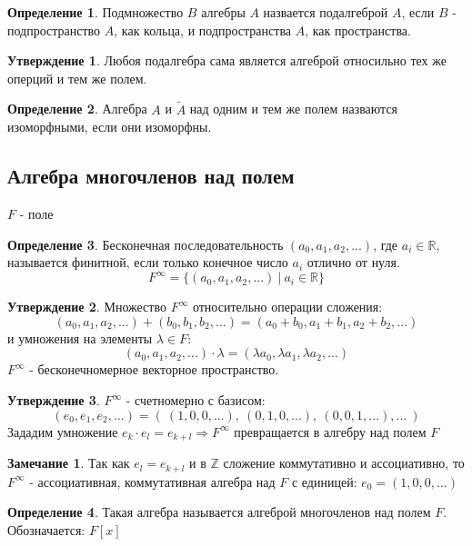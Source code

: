 \documentclass[a4paper, 12pt]{article}
\newcommand{\R}{\mathbb R}
\newcommand{\Z}{\mathbb Z}
\theoremstyle{definition}
\newtheorem*{definition}{Определение}
\newtheorem*{subtheorem}{Утверждение}
\newtheorem*{remark}{Замечание}
\begin{document}
  \begin{definition}
    Подмножество $B$ алгебры $A$ назвается подалгеброй $A$, если $B$ - подпространство $A$, как кольца, и подпространства $A$, как пространства.      
  \end{definition} 
  \begin{subtheorem}
    Любоя подалгебра сама является алгеброй относильно тех же оперций и тем же полем.
  \end{subtheorem} 
  \begin{definition}
    Алгебра $A$ и $\widetilde{A}$ над одним и тем же полем назваются изоморфными, если они изоморфны. 
  \end{definition}

  \subsection{Алгебра многочленов над полем}
  $F$ - поле
  \begin{definition}
    Бесконечная последовательность $(a_0,a_1, a_2,...)$, где $a_i \in \R$, называется финитной, если только конечное число $a_i$ отлично от нуля. 
    $$F^{\infty} = \{(a_0,a_1, a_2,...) \ |\ a_i \in \R\}$$ 
  \end{definition}  
  \begin{subtheorem}
    Множество $F^{\infty}$ относительно операции сложения: $$(a_0,a_1, a_2,...) + (b_0,b_1, b_2,...) = (a_0+b_0,a_1+b_1, a_2+b_2,...)$$ и умножения на элементы $\lambda \in F$: $$(a_0,a_1, a_2,...) \cdot \lambda = (\lambda a_0,\lambda a_1, \lambda a_2,...)$$
    $F^{\infty}$ - бесконечномерное векторное пространство.   
  \end{subtheorem} 
  \begin{subtheorem}
    $F^{\infty}$ - счетномерно с базисом:
    $$(e_0,e_1,e_2,...) = ( \ (1, 0, 0, ...), \ (0, 1, 0, ...), \ (0, 0, 1, ...), ... \ )$$ 
    Зададим умножение $e_k \cdot e_l = e_{k+l} \Longrightarrow F^{\infty}$  превращается в алгебру над полем $F$ 
  \end{subtheorem} 
  \begin{remark}
    Так как $e_l = e_{k+l}$ и в $\Z$ сложение коммутативно и ассоциативно, то $F^{\infty}$ - ассоциативная, коммутативная алгебра над $F$ с единицей: $e_0 = (1, 0, 0, ...)$
  \end{remark} 
  \begin{definition}
    Такая алгебра называется алгеброй многочленов над полем $F$. 
    Обозначается: $F[x]$  
  \end{definition} 
\end{document}
